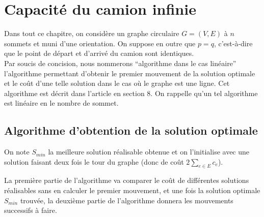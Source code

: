 \chapter{Capacité du camion infinie}

Dans tout ce chapitre, on considère un graphe circulaire $G = (V,E)$ à $n$ sommets et muni d'une orientation. On suppose en outre que $p=q$, c'est-à-dire que le point de départ et d'arrivé du camion sont identiques.
\\

Par soucis de concision, nous nommerons ``algorithme dans le cas linéaire'' l'algorithme permettant d'obtenir le premier mouvement de la solution optimale et le coût d'une telle solution dans le cas où le graphe est une ligne. Cet algorithme est décrit dans l'article \cite{Benchimol2011} en section 8. On rappelle qu'un tel algorithme est linéaire en le nombre de sommet.

\section{Algorithme d'obtention de la solution optimale}
\label{Algorithme circulaire infini}

On note $S_{min}$ la meilleure solution réalisable obtenue et on l'initialise avec une solution faisant deux fois le tour du graphe (donc de coût $2\sum_{e \in E}c_e$).

La première partie de l'algorithme va comparer le coût de différentes solutions réalisables sans en calculer le premier mouvement, et une fois la solution optimale $S_{min}$ trouvée, la deuxième partie de l'algorithme donnera les mouvements successifs à faire.
\\

